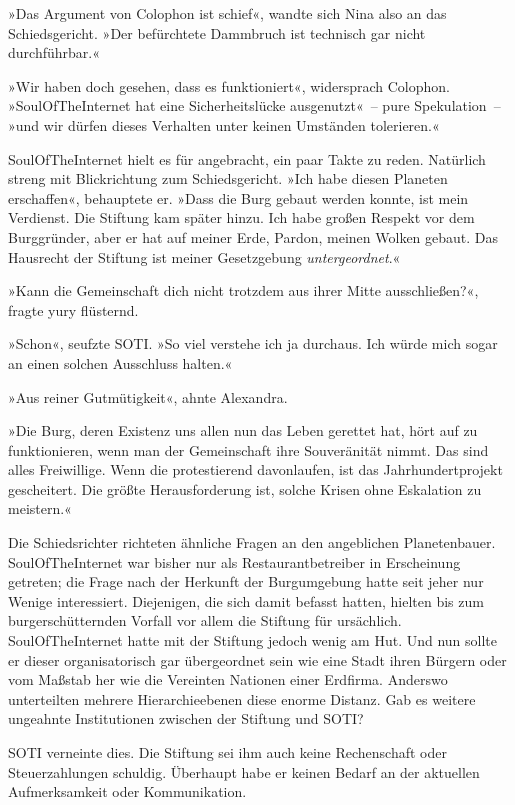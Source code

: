 »Das Argument von Colophon ist schief«, wandte sich Nina also an das Schiedsgericht. »Der befürchtete Dammbruch ist technisch gar nicht durchführbar.«

»Wir haben doch gesehen, dass es funktioniert«, widersprach Colophon. »SoulOfTheInternet hat eine Sicherheitslücke ausgenutzt«~– pure Spekulation~– »und wir dürfen dieses Verhalten unter keinen Umständen tolerieren.«

SoulOfTheInternet hielt es für angebracht, ein paar Takte zu reden. Natürlich streng mit Blickrichtung zum Schiedsgericht. »Ich habe diesen Planeten erschaffen«, behauptete er. »Dass die Burg gebaut werden konnte, ist mein Verdienst. Die Stiftung kam später hinzu. Ich habe großen Respekt vor dem Burggründer, aber er hat auf meiner Erde, Pardon, meinen Wolken gebaut. Das Hausrecht der Stiftung ist meiner Gesetzgebung \emph{untergeordnet}.«

»Kann die Gemeinschaft dich nicht trotzdem aus ihrer Mitte ausschließen?«, fragte yury flüsternd.

»Schon«, seufzte SOTI. »So viel verstehe ich ja durchaus. Ich würde mich sogar an einen solchen Ausschluss halten.«

»Aus reiner Gutmütigkeit«, ahnte Alexandra.

»Die Burg, deren Existenz uns allen nun das Leben gerettet hat, hört auf zu funktionieren, wenn man der Gemeinschaft ihre Souveränität nimmt. Das sind alles Freiwillige. Wenn die protestierend davonlaufen, ist das Jahrhundertprojekt gescheitert. Die größte Herausforderung ist, solche Krisen ohne Eskalation zu meistern.«

Die Schiedsrichter richteten ähnliche Fragen an den angeblichen Planetenbauer. SoulOfTheInternet war bisher nur als Restaurantbetreiber in Erscheinung getreten; die Frage nach der Herkunft der Burgumgebung hatte seit jeher nur Wenige interessiert. Diejenigen, die sich damit befasst hatten, hielten bis zum burgerschütternden Vorfall vor allem die Stiftung für ursächlich. SoulOfTheInternet hatte mit der Stiftung jedoch wenig am Hut. Und nun sollte er dieser organisatorisch gar übergeordnet sein wie eine Stadt ihren Bürgern oder vom Maßstab her wie die Vereinten Nationen einer Erdfirma. Anderswo unterteilten mehrere Hierarchieebenen diese enorme Distanz. Gab es weitere ungeahnte Institutionen zwischen der Stiftung und SOTI?

SOTI verneinte dies. Die Stiftung sei ihm auch keine Rechenschaft oder Steuerzahlungen schuldig. Überhaupt habe er keinen Bedarf an der aktuellen Aufmerksamkeit oder Kommunikation.

